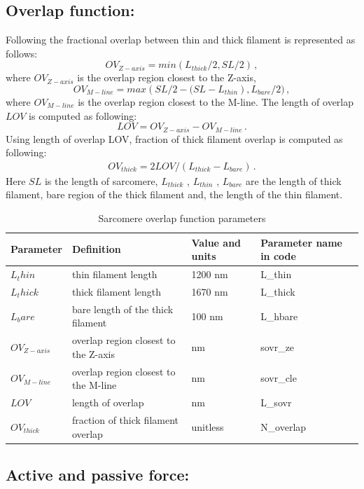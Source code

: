 \documentclass[fleqn,10pt]{physiome}
\begin{document}
\subsection{Overlap function:}

Following \cite{Rice2008} the fractional overlap between thin and thick filament is represented as follows:
\[
  OV_{Z-axis} = min\left(L_{thick}/2,SL/2\right) \, ,
\]
where $OV_{Z-axis}$ is the overlap region closest to the Z-axis,
\[
  OV_{M-line} = max\left(SL/ 2 - (SL - L_{thin} \right), L_{bare}/2) \, ,	
\]
where $OV_{M-line}$ is the overlap region closest to the M-line. The length of overlap $LOV$ is computed as following:
\[
 LOV = OV_{Z-axis} - OV_{M-line}  \, .
\]
Using length of overlap LOV, fraction of thick filament overlap is computed as following:
\begin{eqnarray}
  OV_{thick} = 2 LOV / (L_{thick}- L_{bare} ) \, .
\end{eqnarray}
Here $SL$ is the length of sarcomere, $L_{thick}$ , $L_{thin}$ , $L_{bare}$ are the length of thick filament, bare region of the thick filament and, the length of the thin filament.

\begin{table}[ht]\centering
\small
\caption{Sarcomere overlap function parameters}\label{tab:6}
\begin{tabular}{l l l l}
\toprule
Parameter & Definition & Value and units & Parameter name in code \\
\midrule
$L_thin$      & thin filament length                 & 1200 nm & L\_thin  \\
$L_thick$     & thick filament length                & 1670 nm & L\_thick \\
$L_bare$      & bare length of the thick filament    & 100 nm  & L\_hbare \\
$OV_{Z-axis}$ &	overlap region closest to the Z-axis & nm      & sovr\_ze \\
$OV_{M-line}$ &	overlap region closest to the M-line & nm      & sovr\_cle \\
$LOV$	      & length of overlap                    & nm      & L\_sovr  \\
$OV_{thick}$  & fraction of thick filament overlap   & unitless  & N\_overlap \\

\bottomrule 
\end{tabular}
\end{table}

\subsection{Active and passive force:}
\end{document}
